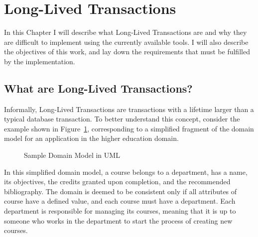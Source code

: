 \documentclass{llncs}
\begin{document}

\section{Long-Lived Transactions}

In this Chapter I will describe what Long-Lived Transactions are and
why they are difficult to implement using the currently available
tools. I will also describe the objectives of this work, and lay down
the requirements that must be fulfilled by the implementation.

\subsection{What are Long-Lived Transactions?}
\label{sec:what}

Informally, Long-Lived Transactions are transactions with a lifetime
larger than a typical database transaction. To better understand this
concept, consider the example shown in Figure~\ref{fig:courseDomain},
corresponding to a simplified fragment of the domain model for an
application in the higher education domain.

\begin{figure}
  \centering

\caption{Sample Domain Model in UML}
\label{fig:courseDomain}

\end{figure}

In this simplified domain model, a course belongs to a department, has
a name, its objectives, the credits granted upon completion, and the
recommended bibliography. The domain is deemed to be consistent only
if all attributes of course have a defined value, and each course must
have a department. Each department is responsible for managing its
courses, meaning that it is up to someone who works in the department
to start the process of creating new courses.
\end{document}
